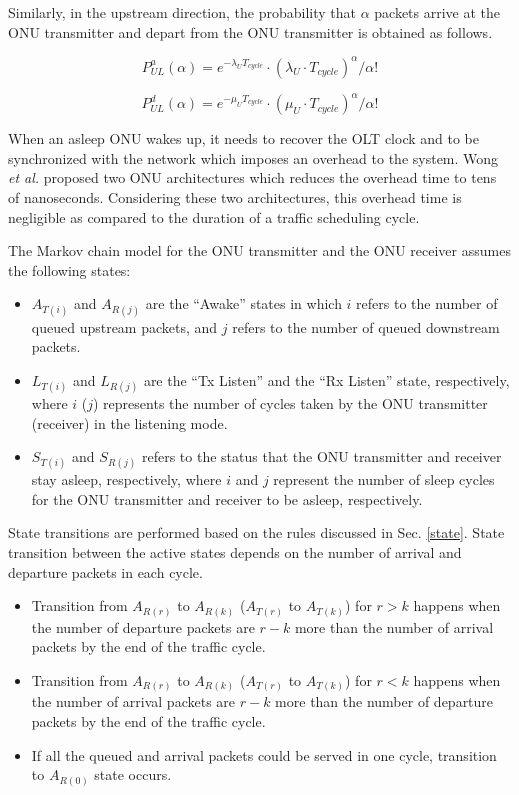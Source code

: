 \documentclass[11pt,english,12pt,onecolumn, draftcls]{IEEEtran}
\theoremstyle{plain}
\theoremstyle{definition}
\begin{document}
Similarly, in the upstream direction, the probability that $\alpha$ packets arrive at the ONU transmitter and depart from the ONU transmitter is obtained as follows.

\begin{equation}
\label{Ta}
P_{UL}^a(\alpha)=e^{-\lambda_U T_{cycle}}\cdot (\lambda_U \cdot T_{cycle})^\alpha/\alpha!
\end{equation}

\begin{equation}
\label{Td}
P_{UL}^d(\alpha)=e^{-\mu_U T_{cycle}}\cdot (\mu_U \cdot T_{cycle})^\alpha/\alpha!
\end{equation}

When an asleep ONU wakes up, it needs to recover the OLT clock and to be synchronized with the network which imposes an overhead to the system. Wong \emph{et al.} \cite{Wongslp09} proposed two ONU architectures which reduces the overhead time to tens of nanoseconds. Considering these two architectures, this overhead time is negligible as compared to the duration of a traffic scheduling cycle.

The Markov chain model for the ONU transmitter and the ONU receiver assumes the following states:
\begin{itemize}
\item ${A}_{T(i)}$ and ${A}_{R(j)}$ are the ``Awake'' states in which $i$ refers to the number of queued  upstream packets, and $j$ refers to the number of queued downstream packets.
\item ${L}_{T(i)}$ and ${L}_{R(j)}$ are the ``Tx Listen'' and the ``Rx Listen'' state, respectively, where $i$ ($j$) represents the number of cycles taken by the ONU transmitter (receiver) in the listening mode.
\item ${S}_{T(i)}$ and ${S}_{R(j)}$ refers to the status that the ONU transmitter and receiver stay asleep, respectively, where $i$ and $j$ represent the number of sleep cycles for the ONU transmitter and receiver to be asleep, respectively.
\end{itemize}
State transitions are performed based on the rules discussed in Sec. \ref{state}. State transition between the active states depends on the number of arrival and departure packets in each cycle.
\begin{itemize}
\item Transition from ${A}_{R(r)}$ to ${A}_{R(k)}$ (${A}_{T(r)}$ to ${A}_{T(k)}$) for $r>k$ happens when the number of departure packets are $r-k$ more than the number of arrival packets by the end of the traffic cycle.
\item Transition from ${A}_{R(r)}$ to ${A}_{R(k)}$ (${A}_{T(r)}$ to ${A}_{T(k)}$) for $r<k$ happens when the number of arrival packets are $r-k$ more than the number of departure packets by the end of the traffic cycle.
\item If all the queued and arrival packets could be served in one cycle, transition to ${A}_{R(0)}$ state occurs.
\end{itemize}
\end{document}
